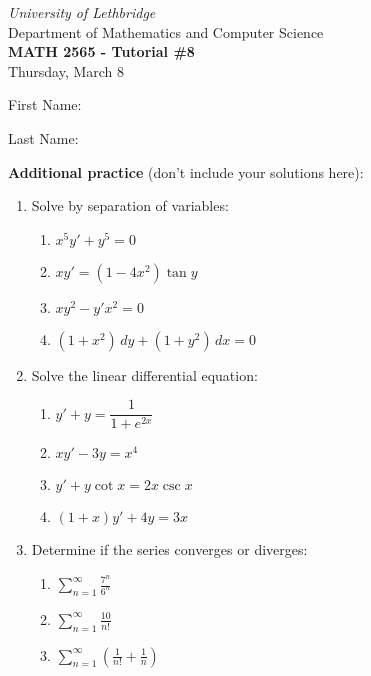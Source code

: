 \documentclass[12pt]{article}
\newcommand{\skipline}{\vspace{12pt}}
\newcommand{\di}{\displaystyle}
\begin{document}
\author{Instructor: Sean Fitzpatrick}
\thispagestyle{empty}
\begin{center}
\emph{University of Lethbridge}\\
Department of Mathematics and Computer Science\\
{\bf MATH 2565 - Tutorial \#8}\\
Thursday, March 8
\end{center}
\skipline \skipline \skipline \noindent \skipline

\skipline
First Name:\underline{\hspace{348pt}}\\
\skipline

\vspace{1cm}

Last Name:\underline{\hspace{351pt}}



\vspace{2cm}





\textbf{Additional practice} (don't include your solutions here):
\begin{enumerate}
\item Solve by separation of variables:
\begin{multicols}{2}
\begin{enumerate}
 \item $x^5y'+y^5=0$
 \item $xy'=(1-4x^2)\tan y$
 \item $xy^2-y'x^2=0$
 \item $(1+x^2)\,dy+(1+y^2)\,dx=0$
\end{enumerate}
\end{multicols}
\item Solve the linear differential equation:
\begin{multicols}{2}
\begin{enumerate}
 \item $y'+y=\dfrac{1}{1+e^{2x}}$
 \item $xy'-3y=x^4$
 \item $y'+y\cot x = 2x\csc x$
 \item $(1+x)y'+4y=3x$
\end{enumerate}
\end{multicols}

\item Determine if the series converges or diverges:
\begin{multicols}{3}
\begin{enumerate}
 \item $\di \sum_{n=1}^\infty \frac{7^n}{6^n}$
 \item $\di \sum_{n=1}^\infty \frac{10}{n!}$
 \item $\di \sum_{n=1}^\infty\left(\frac{1}{n!}+\frac{1}{n}\right)$
\end{enumerate}
\end{multicols}
\end{enumerate}
\end{document}
